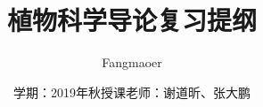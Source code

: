\documentclass[UTF8, a4paper]{book}
\begin{document}
\title{\textbf{植物科学导论复习提纲}}
\author{Fangmaoer}
\date{学期：2019年秋\qquad 授课老师：谢道昕、张大鹏}
\maketitle
\tableofcontents{}


\mainmatter
\hypersetup{pageanchor=true}













\appendix

\end{document}
